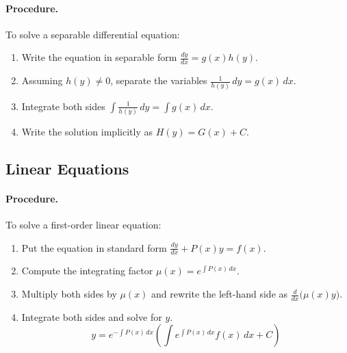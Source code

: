 \documentclass[oneside]{book}
\begin{document}
\paragraph{Procedure.}
To solve a separable differential equation:
\begin{enumerate}
    \item Write the equation in separable form $\frac{dy}{dx}=g(x)h(y)$.
    \item Assuming $h(y)\neq 0$, separate the variables $\frac{1}{h(y)}\,dy=g(x)\,dx$. 
     \item Integrate both sides $\int \frac{1}{h(y)}\,dy=\int g(x)\,dx$. 
    \item Write the solution implicitly as $ H(y)=G(x)+C$.
\end{enumerate}



\subsection{Linear Equations}


\paragraph{Procedure.}
To solve a first-order linear equation:
\begin{enumerate}
    \item Put the equation in standard form $\frac{dy}{dx}+P(x)y=f(x)$. 
    \item Compute the integrating factor $\mu(x)=e^{\int P(x)\,dx}$. 
    \item Multiply both sides by $\mu(x)$ and rewrite the left-hand side as $\frac{d}{dx}\bigl(\mu(x)y\bigr)$. 
    \item Integrate both sides and solve for $y$.
    \[
    y=e^{-\int P(x)\,dx}
    \left(
        \int e^{\int P(x)\,dx}f(x)\,dx+C
    \right)
    \]
\end{enumerate}
\end{document}
